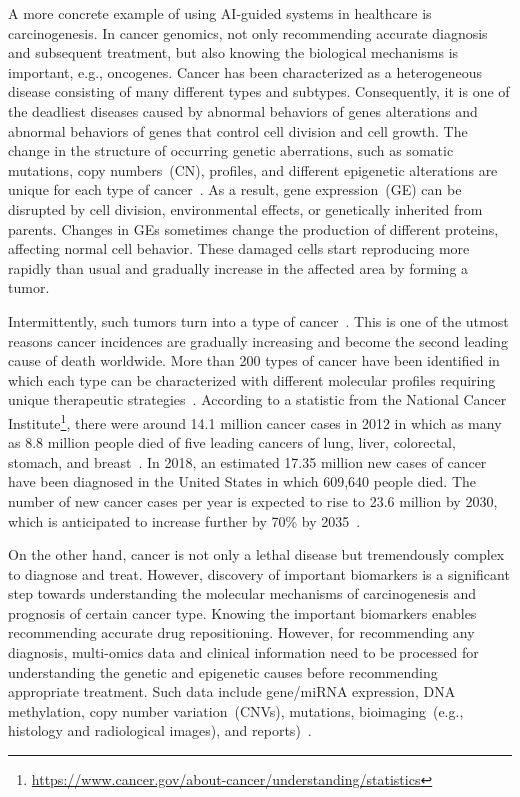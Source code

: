 \hspace*{3.5mm} A more concrete example of using AI-guided systems in healthcare is carcinogenesis. In cancer genomics, not only recommending accurate diagnosis and subsequent treatment, but also knowing the biological mechanisms is important, e.g., oncogenes. Cancer has been characterized as a heterogeneous disease consisting of many different types and subtypes. Consequently, it is one of the deadliest diseases caused by abnormal behaviors of genes alterations and abnormal behaviors of genes that control cell division and cell growth. The change in the structure of occurring genetic aberrations, such as somatic mutations, copy numbers~(CN), profiles, and different epigenetic alterations are unique for each type of cancer~\cite{82Tomczak,13cancerdef,19Cruz}. As a result, gene expression~(GE) can be disrupted by cell division, environmental effects, or genetically inherited from parents. Changes in GEs sometimes change the production of different proteins, affecting normal cell behavior. These damaged cells start reproducing more rapidly than usual and gradually increase in the affected area by forming a tumor. 

\hspace*{3.5mm} Intermittently, such tumors turn into a type of cancer~\cite{zuo2019identification,24Podolsky}. This is one of the utmost reasons cancer incidences are gradually increasing and become the second leading cause of death worldwide. More than 200 types of cancer have been identified in which each type can be characterized with different molecular profiles requiring unique therapeutic strategies~\cite{82Tomczak}. According to a statistic from the National Cancer Institute\footnote{\url{https://www.cancer.gov/about-cancer/understanding/statistics}}, there were around 14.1 million cancer cases in 2012 in which as many as 8.8 million people died of five leading cancers of lung, liver, colorectal, stomach, and breast~\cite{stat}. In 2018, an estimated 17.35 million new cases of cancer have been diagnosed in the United States in which 609,640 people died. The number of new cancer cases per year is expected to rise to 23.6 million by 2030, which is anticipated to increase further by 70\% by 2035~\cite{71Torre}. 

\hspace*{3.5mm} On the other hand, cancer is not only a lethal disease but tremendously complex to diagnose and treat. However, discovery of important biomarkers is a significant step towards understanding the molecular mechanisms of carcinogenesis and prognosis of certain cancer type. Knowing the important biomarkers enables recommending accurate drug repositioning. However, for recommending any diagnosis, multi-omics data and clinical information need to be processed for understanding the genetic and epigenetic causes before recommending appropriate treatment. Such data include gene/miRNA expression, DNA methylation, copy number variation~(CNVs), mutations, bioimaging~(e.g., histology and radiological images), and reports)~\cite{22Ding, 23Zheng}.  

